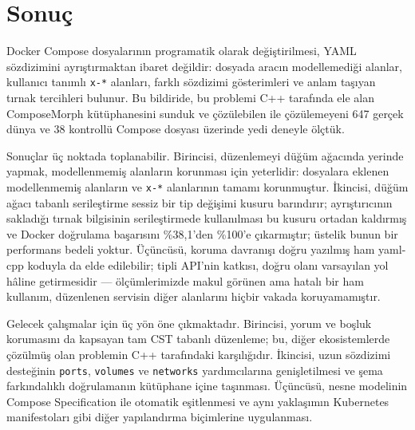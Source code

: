 \documentclass[conference]{IEEEtran}
\begin{document}
\section{Sonuç}
\label{sec:sonuc}

Docker Compose dosyalarının programatik olarak değiştirilmesi, YAML
sözdizimini ayrıştırmaktan ibaret değildir: dosyada aracın modellemediği
alanlar, kullanıcı tanımlı \texttt{x-*} alanları, farklı sözdizimi gösterimleri ve anlam
taşıyan tırnak tercihleri bulunur. Bu bildiride, bu problemi C++ tarafında
ele alan ComposeMorph kütüphanesini sunduk ve çözülebilen ile
çözülemeyeni 647 gerçek dünya ve 38 kontrollü Compose dosyası üzerinde
yedi deneyle ölçtük.

Sonuçlar üç noktada toplanabilir. Birincisi, düzenlemeyi düğüm ağacında
yerinde yapmak, modellenmemiş alanların korunması için yeterlidir:
dosyalara eklenen modellenmemiş alanların ve \texttt{x-*} alanlarının
tamamı korunmuştur.
İkincisi, düğüm ağacı tabanlı serileştirme sessiz bir tip değişimi
kusuru barındırır; ayrıştırıcının sakladığı tırnak bilgisinin
serileştirmede kullanılması bu kusuru ortadan kaldırmış ve Docker
doğrulama başarısını \%38,1'den \%100'e çıkarmıştır; üstelik bunun bir
performans bedeli yoktur. Üçüncüsü, koruma davranışı doğru yazılmış ham
yaml-cpp koduyla da elde edilebilir; tipli API'nin katkısı, doğru olanı
varsayılan yol hâline getirmesidir --- ölçümlerimizde makul görünen ama
hatalı bir ham kullanım, düzenlenen servisin diğer alanlarını hiçbir
vakada koruyamamıştır.

Gelecek çalışmalar için üç yön öne çıkmaktadır. Birincisi, yorum ve boşluk
korumasını da kapsayan tam CST tabanlı düzenleme; bu, diğer ekosistemlerde
çözülmüş olan problemin C++ tarafındaki karşılığıdır. İkincisi, uzun
sözdizimi desteğinin \texttt{ports}, \texttt{volumes} ve \texttt{networks}
yardımcılarına genişletilmesi ve şema farkındalıklı doğrulamanın
kütüphane içine taşınması. Üçüncüsü, nesne modelinin Compose
Specification ile otomatik eşitlenmesi ve aynı yaklaşımın Kubernetes
manifestoları gibi diğer yapılandırma biçimlerine uygulanması.

\end{document}
